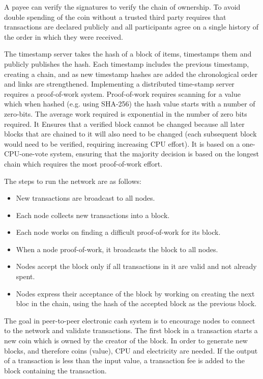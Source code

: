         A payee can verify the signatures to verify the chain of ownership. To avoid double spending of the coin without a trusted third party requires that transactions are declared publicly and all participants agree on a single history of the order in which they were received.
        
        
        The timestamp server takes the hash of a block of items, timestamps them and publicly publishes the hash. Each timestamp includes the previous timestamp, creating a chain, and as new timestamp hashes are added the chronological order and links are strengthened. Implementing a distributed time-stamp server requires a proof-of-work system.
        Proof-of-work requires scanning for a value which when hashed (e.g. using SHA-256) the hash value starts with a number of zero-bits. The average work required is exponential in the number of zero bits required. It Ensures that a verified block cannot be changed because all later blocks that are chained to it will also need to be changed (each subsequent block would need to be verified, requiring increasing CPU effort). It is based on a one-CPU-one-vote system, ensuring that the majority decision is based on the longest chain which requires the most proof-of-work effort.
	      
	     The steps to run the network are as follows:
	     \begin{itemize}
        \item New transactions are broadcast to all nodes.
        \item Each node collects new transactions into a block.
         \item Each node works on finding a difficult proof-of-work for its block.
        \item  When a node proof-of-work, it broadcasts the block to all nodes.
         \item Nodes accept the block only if all transactions in it are valid and not already spent.
        \item  Nodes express their acceptance of the block by working on creating the next bloc in the chain, using the hash of the accepted block as the previous block.   	     \end{itemize}
         The goal in peer-to-peer electronic cash system is to encourage nodes to connect to the network and validate transactions. The first block in a transaction starts a new coin which is owned by the creator of the block. In order to generate new blocks, and therefore coins (value), CPU and electricity are needed. If the output of a transaction is less than the input value, a transaction fee is added to the block containing the transaction.
         

